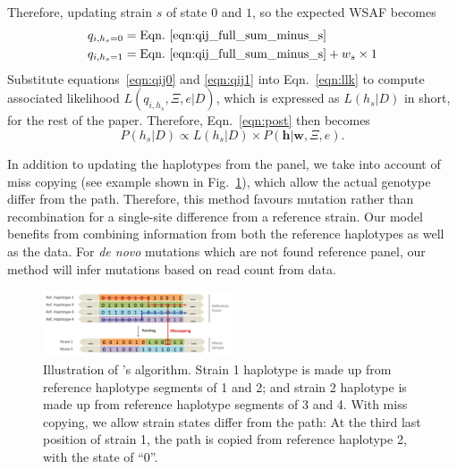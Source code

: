 \documentclass{bioinfo}
\begin{document}
Therefore, updating strain $s$ of state $0$ and $1$, so the expected WSAF becomes
\begin{align}
q_{i,h_s=0} & = \textrm{Eqn.~\eqref{eqn:qij_full_sum_minus_s}} \label{eqn:qij0}\\
q_{i,h_s=1} & = \textrm{Eqn.~\eqref{eqn:qij_full_sum_minus_s}} + w_s \times 1 \label{eqn:qij1}
\end{align}
Substitute equations~\eqref{eqn:qij0} and \eqref{eqn:qij1} into Eqn.~\eqref{eqn:llk} to compute associated likelihood $L(q_{i,h_s}, \Xi, e |D)$, which is expressed as $L(h_s |D)$ in short, for the rest of the paper. Therefore, Eqn.~\ref{eqn:post} then becomes
\begin{equation}
P(h_s |D) \propto  L(h_s |D) \times P(\mathbf{h}|\mathbf{w}, \Xi, e).
\end{equation}

In addition to updating the haplotypes from the panel, we take into account of miss copying (see example shown in Fig.~\ref{fig:ls}), which allow the actual genotype differ from the path. Therefore, this method favours mutation rather than recombination for a single-site difference from a reference strain. Our model benefits from combining information from both the reference haplotypes as well as the data. For {\em de novo} mutations which are not found reference panel, our method will infer mutations based on read count from data.

\begin{figure}[ht]
\centering
\includegraphics[width=0.5\textwidth]{coupled-painting.png}
\caption{Illustration of \citet{Li2003}'s algorithm. Strain 1 haplotype is made up from reference haplotype segments of 1 and 2; and strain 2 haplotype is made up from reference haplotype segments of 3 and 4. With miss copying, we allow strain states differ from the path: At the third last position of strain 1, the path is copied from reference haplotype 2, with the state of ``0''.
}\label{fig:ls}
\end{figure}
\end{document}
